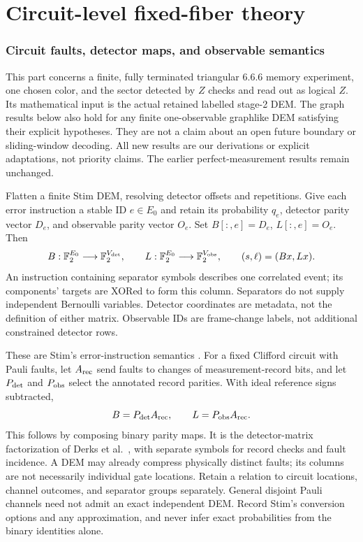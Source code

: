 \clearpage
\part{Circuit-level fixed-fiber theory}
\label{part:circuit}
\section{Circuit faults, detector maps, and observable semantics}
\label{sec:cl-dem}
This part concerns a finite, fully terminated triangular 6.6.6 memory
experiment, one chosen color, and the sector detected by $Z$ checks and
read out as logical $Z$. Its mathematical input is the actual retained
labelled stage-2 DEM. The graph results below also hold for any finite
one-observable graphlike DEM satisfying their explicit hypotheses. They
are not a claim about an open future boundary or sliding-window decoding.
All new results are our derivations or explicit adaptations, not priority
claims. The earlier perfect-measurement results remain unchanged.

\begin{definition}\label{def:cl-dem}
Flatten a finite Stim DEM, resolving detector offsets and repetitions.
Give each error instruction a stable ID $e\in E_0$ and retain its probability
$q_e$, detector parity vector $D_e$, and observable parity vector $O_e$.
Set $B[:,e]=D_e$, $L[:,e]=O_e$. Then
\[
 B:\mathbb F_2^{E_0}\longrightarrow\mathbb F_2^{V_{\rm det}},\qquad
 L:\mathbb F_2^{E_0}\longrightarrow\mathbb F_2^{V_{\rm obs}},\qquad
 (s,\ell)=(Bx,Lx).
\]
An instruction containing separator symbols describes one correlated event;
its components' targets are XORed to form this column. Separators do not
supply independent Bernoulli variables. Detector coordinates are metadata,
not the definition of either matrix. Observable IDs are frame-change
labels, not additional constrained detector rows.
\end{definition}
These are Stim's error-instruction semantics \cite{StimDEM}.
For a fixed Clifford circuit with Pauli faults, let $A_{\rm rec}$ send
faults to changes of measurement-record bits, and let $P_{\rm det}$ and
$P_{\rm obs}$ select the annotated record parities. With ideal reference
signs subtracted,
\begin{equation}
 B=P_{\rm det}A_{\rm rec},\qquad L=P_{\rm obs}A_{\rm rec}.
 \label{eq:cl-record}
\end{equation}
This follows by composing binary parity maps. It is the detector-matrix
factorization of Derks et al.\ \cite[Definitions 2.6, 2.8--2.9]{DerksDEM},
with separate symbols for record checks and fault incidence. A DEM may
already compress physically distinct faults; its columns are not necessarily
individual gate locations. Retain a relation to circuit locations, channel
outcomes, and separator groups separately. General disjoint Pauli channels
need not admit an exact independent DEM. Record Stim's conversion options
and any approximation, and never infer exact probabilities from the binary
identities alone.

